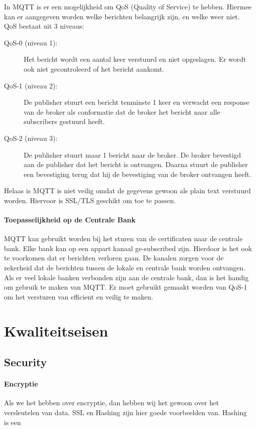 \documentclass{article}
\begin{document}
In MQTT is er een mogelijkheid om QoS (Quality of Service) te hebben.
Hiermee kan er aangegeven worden welke berichten belangrijk zijn,
en welke weer niet.
QoS bestaat uit 3 niveaus:
\begin{description}
	\item [QoS-0 (niveau 1):] Het bericht wordt een aantal keer verstuurd en niet opgeslagen.
		Er wordt ook niet gecontroleerd of het bericht aankomt.
	\item [QoS-1 (niveau 2):] De publisher stuurt een bericht tenminste 1 keer en verwacht
		een response van de broker als conformatie dat de broker het bericht naar alle
		subscribers gestuurd heeft.
	\item [QoS-2 (niveau 3):] De publisher stuurt maar 1 bericht naar de broker. De broker
		bevestigd aan de publisher dat het bericht is ontvangen.
		Daarna stuurt de publisher een bevestiging terug dat hij de bevestiging van de broker
		ontvangen heeft. 
\end{description}
Helaas is MQTT is niet veilig omdat de gegevens gewoon als plain text verstuurd worden.
Hiervoor is SSL/TLS geschikt om toe te passen.

\paragraph{Toepasselijkheid op de Centrale Bank}
MQTT kan gebruikt worden bij het sturen van de certificaten naar de centrale bank.
Elke bank kan op een appart kanaal ge-subscribed zijn.
Hierdoor is het ook te voorkomen dat er berichten verloren gaan.
De kanalen zorgen voor de zekerheid dat de berichten tussen de lokale en centrale bank
worden ontvangen.
Als er veel lokale banken verbonden zijn aan de centrale bank,
dan is het handig om gebruik te maken van MQTT.
Er moet gebruikt gemaakt worden van QoS-1 om het versturen van efficient en veilig te maken.

\clearpage
\newpage

\section{Kwaliteitseisen}

\subsection{Security}

\paragraph{Encryptie}
Als we het hebben over encryptie,
dan hebben wij het gewoon over het versleutelen van data.
SSL en Hashing zijn hier goede voorbeelden van.
Hashing is een 
\end{document}
